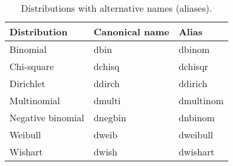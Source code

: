 
\begin{table}[!h]
  \begin{center}
    \begin{tabular}{lll}
      \hline
      Distribution & Canonical name & Alias \\
      \hline
     Binomial & dbin & dbinom \\
     Chi-square & dchisq & dchisqr \\     
Dirichlet & ddirch & ddirich \\
Multinomial & dmulti & dmultinom \\
Negative binomial & dnegbin & dnbinom  \\
    Weibull & dweib & dweibull \\ 
    Wishart & dwish & dwishart \\
     \hline
    \end{tabular}
  \caption{Distributions with alternative names (aliases).}
    \label{table:distributions-aliases}
  \end{center}
\end{table}

\newpage